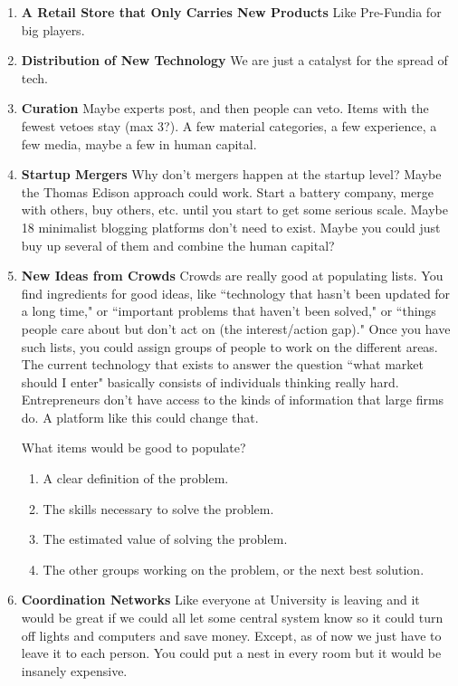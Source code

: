 \documentclass[paper=a4, fontsize=11pt]{scrartcl} %
\numberwithin{equation}{section} %
\numberwithin{figure}{section} %
\numberwithin{table}{section} %
\begin{document}
\begin{enumerate}
\item \textbf{A Retail Store that Only Carries New Products}  Like Pre-Fundia for big players.

\item \textbf{Distribution of New Technology} We are just a catalyst for the spread of tech.  

\item \textbf{Curation}  Maybe experts post, and then people can veto.  Items with the fewest vetoes stay (max 3?).  A few material categories, a few experience, a few media, maybe a few in human capital.  

\item \textbf{Startup Mergers}  Why don't mergers happen at the startup level?  Maybe the Thomas Edison approach could work.  Start a battery company, merge with others, buy others, etc. until you start to get some serious scale.  Maybe 18 minimalist blogging platforms don't need to exist.  Maybe you could just buy up several of them and combine the human capital? 

\item \textbf{New Ideas from Crowds}  Crowds are really good at populating lists.  You find ingredients for good ideas, like ``technology that hasn't been updated for a long time," or ``important problems that haven't been solved," or ``things people care about but don't act on (the interest/action gap)."  Once you have such lists, you could assign groups of people to work on the different areas.  The current technology that exists to answer the question ``what market should I enter" basically consists of individuals thinking really hard.  Entrepreneurs don't have access to the kinds of information that large firms do.  A platform like this could change that.  
	
What items would be good to populate?
	\begin{enumerate}
	\item A clear definition of the problem.
	\item The skills necessary to solve the problem.
	\item The estimated value of solving the problem.  
	\item The other groups working on the problem, or the next best solution.
	\end{enumerate}

\item \textbf{Coordination Networks} Like everyone at  University is leaving and it would be great if we could all let some central system know so it could turn off lights and computers and save money.  Except, as of now we just have to leave it to each person.  You could put a nest in every room but it would be insanely expensive. 


\end{enumerate}
\end{document}
